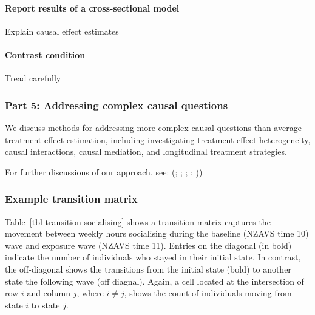 \documentclass[
  singlecolumn]{article}
\let\oldparagraph\paragraph
\renewcommand{\paragraph}[1]{\oldparagraph{#1}\mbox{}}
\begin{document}
\paragraph{Report results of a cross-sectional
model}\label{report-results-of-a-cross-sectional-model}

Explain causal effect estimates

\paragraph{Contrast condition}\label{contrast-condition}

Tread carefully

\subsubsection{Part 5: Addressing complex causal
questions}\label{part-5-addressing-complex-causal-questions}

We discuss methods for addressing more complex causal questions than
average treatment effect estimation, including investigating
treatment-effect heterogeneity, causal interactions, causal mediation,
and longitudinal treatment strategies.

For further discussions of our approach, see:
(;
;
;
;
))

\subsubsection{Example transition
matrix}\label{example-transition-matrix}

Table~\ref{tbl-transition-socialising} shows a transition matrix
captures the movement between weekly hours socialising during the
baseline (NZAVS time 10) wave and exposure wave (NZAVS time 11). Entries
on the diagonal (in bold) indicate the number of individuals who stayed
in their initial state. In contrast, the off-diagonal shows the
transitions from the initial state (bold) to another state the following
wave (off diagnal). Again, a cell located at the intersection of row
\(i\) and column \(j\), where \(i \neq j\), shows the count of
individuals moving from state \(i\) to state \(j\).
\end{document}
